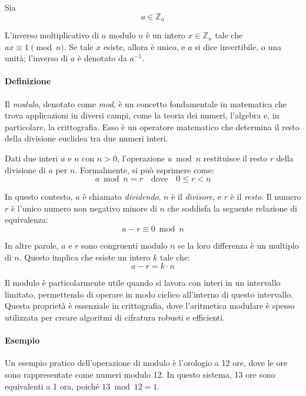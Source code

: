 \documentclass{article}
\theoremstyle{definition}
\begin{document}
Sia
\begin{equation*}
a \in \mathbb{Z}_n
\end{equation*}

L'inverso moltiplicativo di \( a \) modulo \( n \) è un intero \( x \in \mathbb{Z}_n \) tale che \( ax \equiv 1 \pmod{n} \). Se tale \( x \) esiste, allora è unico, e \( a \) si dice invertibile, o una unità; l'inverso di \( a \) è denotato da \( a^{-1} \).



\paragraph{Definizione}
Il \emph{modulo}, denotato come \emph{mod}, è un concetto fondamentale in matematica che trova applicazioni in diversi campi, come la teoria dei numeri, l'algebra e, in particolare, la crittografia. Esso è un operatore matematico che determina il resto della divisione euclidea tra due numeri interi.

Dati due interi $a$ e $n$ con $n > 0$, l'operazione $a \bmod n$ restituisce il resto $r$ della divisione di $a$ per $n$. Formalmente, si può esprimere come:
\begin{equation*}
    a \bmod n = r \quad \text{dove} \quad 0 \leq r < n
\end{equation*}

In questo contesto, $a$ è chiamato \emph{dividendo}, $n$ è il \emph{divisore}, e $r$ è il \emph{resto}. Il numero $r$ è l'unico numero non negativo minore di $n$ che soddisfa la seguente relazione di equivalenza:
\begin{equation*}
    a - r \equiv 0 \bmod n
\end{equation*}

In altre parole, $a$ e $r$ sono congruenti modulo $n$ se la loro differenza è un multiplo di $n$. Questo implica che esiste un intero $k$ tale che:
\begin{equation*}
    a - r = k \cdot n
\end{equation*}

Il modulo è particolarmente utile quando si lavora con interi in un intervallo limitato, permettendo di operare in modo ciclico all'interno di questo intervallo. Questa proprietà è essenziale in crittografia, dove l'aritmetica modulare è spesso utilizzata per creare algoritmi di cifratura robusti e efficienti.

\paragraph{Esempio}Un esempio pratico dell'operazione di modulo è l'orologio a 12 ore, dove le ore sono rappresentate come numeri modulo 12. In questo sistema, 13 ore sono equivalenti a 1 ora, poiché $13 \bmod 12 = 1$.
\end{document}
